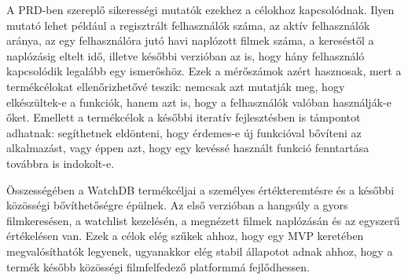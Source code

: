A PRD-ben szereplő sikerességi mutatók ezekhez a célokhoz kapcsolódnak. Ilyen mutató lehet például a regisztrált felhasználók száma, az aktív felhasználók aránya, az egy felhasználóra jutó havi naplózott filmek száma, a kereséstől a naplózásig eltelt idő, illetve későbbi verzióban az is, hogy hány felhasználó kapcsolódik legalább egy ismerőshöz. Ezek a mérőszámok azért hasznosak, mert a termékcélokat ellenőrizhetővé teszik: nemcsak azt mutatják meg, hogy elkészültek-e a funkciók, hanem azt is, hogy a felhasználók valóban használják-e őket. Emellett a termékcélok a későbbi iteratív fejlesztésben is támpontot adhatnak: segíthetnek eldönteni, hogy érdemes-e új funkcióval bővíteni az alkalmazást, vagy éppen azt, hogy egy kevéssé használt funkció fenntartása továbbra is indokolt-e.

Összességében a WatchDB termékcéljai a személyes értékteremtésre és a későbbi közösségi bővíthetőségre épülnek. Az első verzióban a hangsúly a gyors filmkeresésen, a watchlist kezelésén, a megnézett filmek naplózásán és az egyszerű értékelésen van. Ezek a célok elég szűkek ahhoz, hogy egy MVP keretében megvalósíthatók legyenek, ugyanakkor elég stabil állapotot adnak ahhoz, hogy a termék később közösségi filmfelfedező platformmá fejlődhessen.
